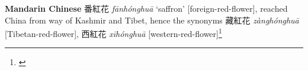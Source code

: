 \begin{etymology}\label{ety:fanhonghua}
\textbf{Mandarin Chinese} {番紅花} \textit{fānhónghuā} `saffron' [foreign-red-flower], reached China from way of Kashmir and Tibet, hence the synonyms 藏紅花 \textit{zànghónghuā} [Tibetan-red-flower], 西紅花 \textit{xīhónghuā} [western-red-flower]\footnote{\textcite{kleeman_oxford_2010}}
\end{etymology}